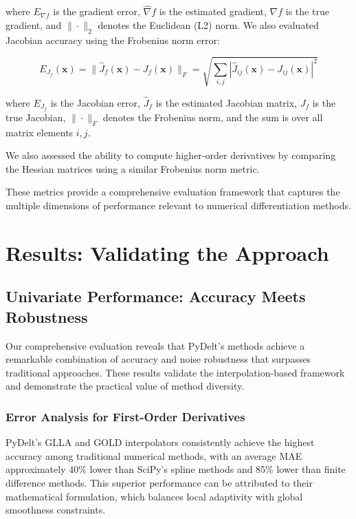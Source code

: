 \documentclass[10pt,journal,compsoc]{IEEEtran}
\begin{document}
\begin{enumerate}
    where $E_{\nabla f}$ is the gradient error, $\hat{\nabla}f$ is the estimated gradient, $\nabla f$ is the true gradient, and $\|\cdot\|_2$ denotes the Euclidean (L2) norm. We also evaluated Jacobian accuracy using the Frobenius norm error:
    
    \begin{equation}
        E_{J_f}(\mathbf{x}) = \|\hat{J}_f(\mathbf{x}) - J_f(\mathbf{x})\|_F = \sqrt{\sum_{i,j}|\hat{J}_{ij}(\mathbf{x}) - J_{ij}(\mathbf{x})|^2}
    \end{equation}
    
    where $E_{J_f}$ is the Jacobian error, $\hat{J}_f$ is the estimated Jacobian matrix, $J_f$ is the true Jacobian, $\|\cdot\|_F$ denotes the Frobenius norm, and the sum is over all matrix elements $i,j$.
    
    We also assessed the ability to compute higher-order derivatives by comparing the Hessian matrices using a similar Frobenius norm metric.
\end{enumerate}

These metrics provide a comprehensive evaluation framework that captures the multiple dimensions of performance relevant to numerical differentiation methods.

\section{Results: Validating the Approach}

\subsection{Univariate Performance: Accuracy Meets Robustness}

Our comprehensive evaluation reveals that PyDelt's methods achieve a remarkable combination of accuracy and noise robustness that surpasses traditional approaches. These results validate the interpolation-based framework and demonstrate the practical value of method diversity.

\subsubsection{Error Analysis for First-Order Derivatives}

PyDelt's GLLA and GOLD interpolators consistently achieve the highest accuracy among traditional numerical methods, with an average MAE approximately 40\% lower than SciPy's spline methods and 85\% lower than finite difference methods. This superior performance can be attributed to their mathematical formulation, which balances local adaptivity with global smoothness constraints.
\end{document}
